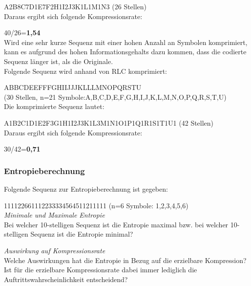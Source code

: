 \documentclass[12pt,german]{article}
\begin{document}
A2B8C7D1E7F2H1I2J3K1L1M1N3 (26 Stellen)\\

Daraus ergibt sich folgende Kompressionsrate:

40/26=\textbf{1,54}\\

Wird eine sehr kurze Sequenz mit einer hohen Anzahl an Symbolen komprimiert, kann es aufgrund des hohen Informationsgehalts dazu kommen, dass die codierte Sequenz länger ist, als die Originale.\\


Folgende Sequenz wird anhand von RLC komprimiert:

ABBCDEEFFFGHIIJJJKLLLMNOPQRSTU\\ (30 Stellen, n=21 Symbole:A,B,C,D,E,F,G,H,I,J,K,L,M,N,O,P,Q,R,S,T,U)\\

Die komprimierte Sequenz lautet:

A1B2C1D1E2F3G1H1I2J3K1L3M1N1O1P1Q1R1S1T1U1 (42 Stellen)\\

Daraus ergibt sich folgende Kompressionsrate:

30/42=\textbf{0,71}\\

\subsubsection{Entropieberechnung}
Folgende Sequenz zur Entropieberechnung ist gegeben:

111122661112233334564511211111 (n=6 Symbole: 1,2,3,4,5,6)\\

\textit{Minimale und Maximale Entropie}\\
Bei welcher 10-stelligen Sequenz ist die Entropie maximal bzw. bei welcher 10-stelligen Sequenz ist die Entropie minimal? 

\textit{Auswirkung auf Kompressionsrate}\\
Welche Auswirkungen hat die Entropie in Bezug auf die erzielbare Kompression?
Ist für die erzielbare Kompressionsrate dabei immer lediglich die Auftrittswahrscheinlichkeit entscheidend?
\end{document}
